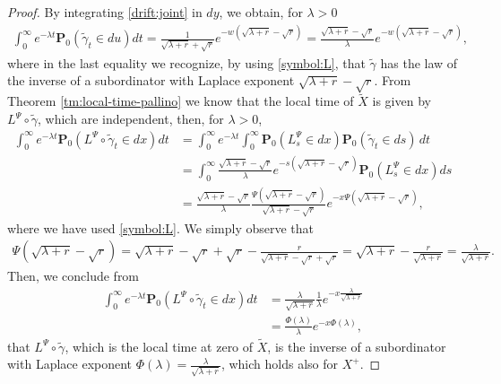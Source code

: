 \documentclass[11pt,a4paper]{article}
\theoremstyle{definition}
\theoremstyle{remark}
\begin{document}
\begin{proof}
	By integrating \eqref{drift:joint} in $dy$, we obtain, for $\lambda>0$
	\begin{align*}
		\int_0^\infty e^{-\lambda t} \mathbf{P}_0(\widetilde{\gamma}_t \in du)dt= \frac{1}{\sqrt{\lambda + r} + \sqrt{r}} e^{-w (\sqrt{\lambda + r} - \sqrt{r}) }=\frac{\sqrt{\lambda + r} - \sqrt{r}}{\lambda} e^{-w (\sqrt{\lambda + r} - \sqrt{r}) },
	\end{align*}
	where in the last equality we recognize, by using \eqref{symbol:L}, that $\widetilde{\gamma}$ has the law of the inverse of a subordinator with Laplace exponent $\sqrt{\lambda + r} - \sqrt{r}$. From Theorem \ref{tm:local-time-pallino} we know that the local time of $\widetilde{X}$ is given by $L^\Psi \circ \widetilde{\gamma}$, which are independent, then, for $\lambda>0$,
	\begin{align*}
		\int_0^\infty e^{-\lambda t} \mathbf{P}_0 (L^\Psi \circ \widetilde{\gamma} _ t \in dx) dt &= \int_0^\infty e^{-\lambda t} \int_0^\infty \mathbf{P}_0 (L^\Psi_s \in dx) \mathbf{P}_0(\widetilde{\gamma}_t \in ds) \, dt\\
		&= \int_0^\infty \frac{\sqrt{\lambda + r} - \sqrt{r}}{\lambda} e^{-s (\sqrt{\lambda + r} - \sqrt{r})} \mathbf{P}_0 (L^\Psi_s \in dx) ds\\
		&= \frac{\sqrt{\lambda + r} - \sqrt{r}}{\lambda}  \frac{\Psi(\sqrt{\lambda + r} - \sqrt{r})}{\sqrt{\lambda + r} - \sqrt{r}} e^{-x \Psi(\sqrt{\lambda + r} - \sqrt{r})},
	\end{align*}
	where we have used \eqref{symbol:L}.  We simply observe that
	\begin{align*}
		\Psi(\sqrt{\lambda + r} - \sqrt{r})= \sqrt{\lambda + r} - \sqrt{r} + \sqrt{r} - \frac{r}{\sqrt{\lambda + r} - \sqrt{r} + \sqrt{r}} = \sqrt{\lambda + r} - \frac{r}{\sqrt{\lambda + r}}= \frac{\lambda}{\sqrt{\lambda + r}}.
	\end{align*}
	Then, we conclude from
	\begin{align*}
		\int_0^\infty e^{-\lambda t} \mathbf{P}_0 (L^\Psi \circ \widetilde{\gamma} _ t \in dx) dt&=  \frac{\lambda}{\sqrt{\lambda + r}} \frac{1}{\lambda} e^{-x \frac{\lambda}{\sqrt{\lambda + r}}}\\
		&=  \frac{\Phi(\lambda)}{\lambda} e^{-x\Phi(\lambda)},
	\end{align*}
	that $L^\Psi \circ \widetilde{\gamma}$, which is the local time at zero of $\widetilde{X}$, is the inverse of a subordinator with Laplace exponent $\Phi(\lambda)= \frac{\lambda}{\sqrt{\lambda + r}}$, which holds also for $X^+$.
\end{proof}
\end{document}
